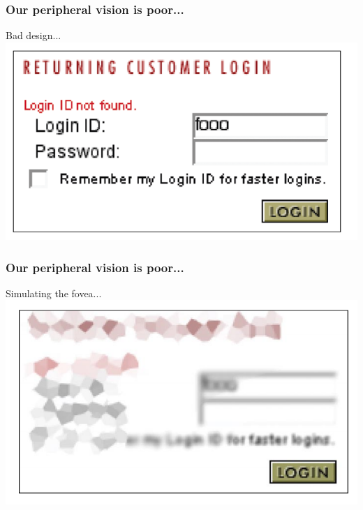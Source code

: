 \documentclass{beamer}
\begin{document}


\begin{frame}
\frametitle{Our peripheral vision is poor...}
Bad design...
\vfill
\centering
\includegraphics[width=1\linewidth]{image/peripheral5}
\end{frame}

\begin{frame}
\frametitle{Our peripheral vision is poor...}
Simulating the fovea...
\vfill
\centering
\includegraphics[width=0.8\linewidth]{image/peripheral6}
\end{frame}
\end{document}

